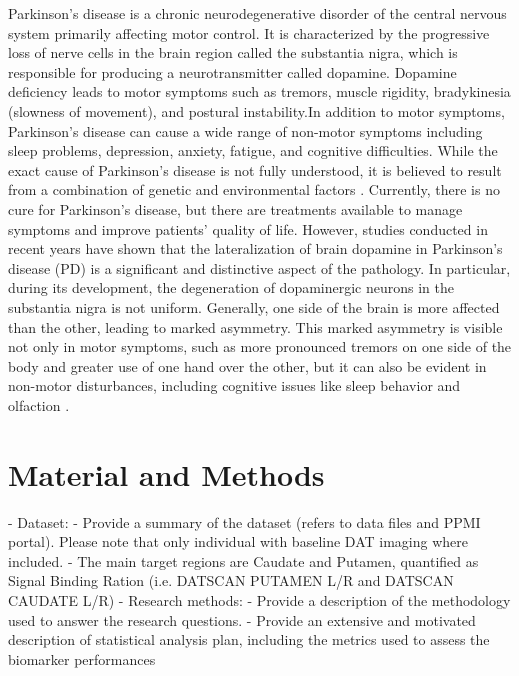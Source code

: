 \documentclass[]{article}
\begin{document}
Parkinson's disease is a chronic neurodegenerative disorder of the central nervous system primarily affecting motor control. It is characterized by the progressive loss of nerve cells in the brain region called the substantia nigra, which is responsible for producing a neurotransmitter called dopamine. Dopamine deficiency leads to motor symptoms such as tremors, muscle rigidity, bradykinesia (slowness of movement), and postural instability.In addition to motor symptoms, Parkinson's disease can cause a wide range of non-motor symptoms including sleep problems, depression, anxiety, fatigue, and cognitive difficulties. While the exact cause of Parkinson's disease is not fully understood, it is believed to result from a combination of genetic and environmental factors \cite{beitz_parkinsons_2014}. Currently, there is no cure for Parkinson's disease, but there are treatments available to manage symptoms and improve patients’ quality of life.  However, studies conducted in recent years have shown that the lateralization of brain dopamine in Parkinson's disease (PD) is a significant and distinctive aspect of the pathology. In particular, during its development, the degeneration of dopaminergic neurons in the substantia nigra is not uniform. Generally, one side of the brain is more affected than the other, leading to marked asymmetry. This marked asymmetry is visible not only in motor symptoms, such as more pronounced tremors on one side of the body and greater use of one hand over the other, but it can also be evident in non-motor disturbances, including cognitive issues like sleep behavior and olfaction \cite{riederer_lateralisation_2018}.




\section{Material and Methods}

- Dataset:
\newline
	- Provide a summary of the dataset (refers to data files and PPMI
	portal). Please note that only individual with baseline DAT imaging 
	where included.
\newline
	- The main target regions are Caudate and Putamen, quantified as 
	Signal Binding Ration (i.e. DATSCAN PUTAMEN L/R and 
	DATSCAN CAUDATE L/R)
\newline
- Research methods:
\newline
	- Provide a description of the methodology used to answer the research 
	questions. 
	\newline
	- Provide an extensive and motivated description of statistical analysis plan, including the metrics used to assess the biomarker 
	performances
\end{document}
